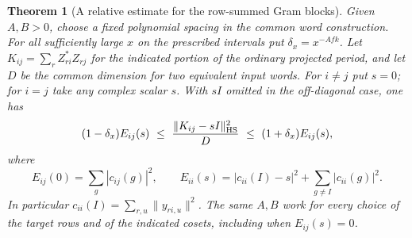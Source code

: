 \documentclass[a4paper,11pt]{article}
\newtheorem{theorem}[proposition]{Theorem}
\theoremstyle{definition}
\theoremstyle{remark}
\numberwithin{equation}{section}
\begin{document}
\begin{theorem}[A relative estimate for the row-summed Gram blocks]
\leavevmode\label{thm:rowsumgram637}
Given \(A,B>0\), choose a fixed polynomial spacing in the common
word construction. For all sufficiently large \(x\) on the prescribed
intervals put \(\delta_x=x^{-Afk}\). Let
\(K_{ij}=\sum_r Z_{ri}^*Z_{rj}\) for the indicated portion of the
ordinary projected period, and let \(D\) be the common dimension
for two equivalent input words. For \(i\ne j\) put \(s=0\);
for \(i=j\) take any complex scalar \(s\). With \(sI\) omitted
in the off-diagonal case, one has
\[
 (1-\delta_x) E_{ij}(s)\ \le\
       \frac{\|K_{ij}-sI\|_{\rm HS}^2}{D}
                          \ \le\ (1+\delta_x) E_{ij}(s),
\]
where
\[
 E_{ij}(0)=\sum_g|c_{ij}(g)|^2,\qquad
 E_{ii}(s)=|c_{ii}(I)-s|^2+\sum_{g\ne I}|c_{ii}(g)|^2 .
\]
In particular \(c_{ii}(I)=\sum_{r,u}\|y_{ri,u}\|^2\).
The same \(A,B\) work for every choice of the target rows and of
the indicated cosets, including when \(E_{ij}(s)=0\).
\end{theorem}
\end{document}
